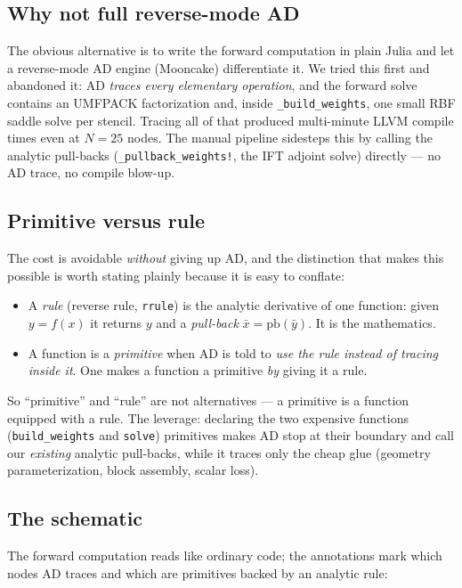 \documentclass[11pt,a4paper]{article}
\begin{document}
\subsection{Why not full reverse-mode AD}

The obvious alternative is to write the forward computation in plain Julia and let a
reverse-mode AD engine (Mooncake) differentiate it. We tried this first and
abandoned it: AD \emph{traces every elementary operation}, and the forward solve
contains an UMFPACK factorization and, inside \texttt{\_build\_weights}, one small
RBF saddle solve per stencil. Tracing all of that produced multi-minute LLVM
compile times even at $N=25$ nodes. The manual pipeline sidesteps this by calling
the analytic pull-backs (\texttt{\_pullback\_weights!}, the IFT adjoint solve)
directly --- no AD trace, no compile blow-up.

\subsection{Primitive versus rule}

The cost is avoidable \emph{without} giving up AD, and the distinction that makes
this possible is worth stating plainly because it is easy to conflate:
\begin{itemize}
  \item A \emph{rule} (reverse rule, \texttt{rrule}) is the analytic derivative of
        one function: given $y=f(x)$ it returns $y$ and a \emph{pull-back}
        $\bar x = \mathrm{pb}(\bar y)$. It is the mathematics.
  \item A function is a \emph{primitive} when AD is told to \emph{use the rule
        instead of tracing inside it}. One makes a function a primitive \emph{by}
        giving it a rule.
\end{itemize}
So ``primitive'' and ``rule'' are not alternatives --- a primitive is a function
equipped with a rule. The leverage: declaring the two expensive functions
(\texttt{build\_weights} and \texttt{solve}) primitives makes AD stop at their
boundary and call our \emph{existing} analytic pull-backs, while it traces only the
cheap glue (geometry parameterization, block assembly, scalar loss).

\subsection{The schematic}

The forward computation reads like ordinary code; the annotations mark which nodes
AD traces and which are primitives backed by an analytic rule:
\end{document}
